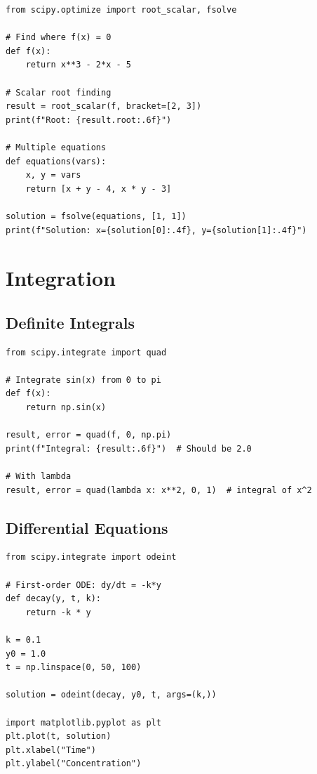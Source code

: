 \begin{lstlisting}
from scipy.optimize import root_scalar, fsolve

# Find where f(x) = 0
def f(x):
    return x**3 - 2*x - 5

# Scalar root finding
result = root_scalar(f, bracket=[2, 3])
print(f"Root: {result.root:.6f}")

# Multiple equations
def equations(vars):
    x, y = vars
    return [x + y - 4, x * y - 3]

solution = fsolve(equations, [1, 1])
print(f"Solution: x={solution[0]:.4f}, y={solution[1]:.4f}")
\end{lstlisting}

\section{Integration}
\label{sec:integration}

\subsection{Definite Integrals}

\begin{lstlisting}
from scipy.integrate import quad

# Integrate sin(x) from 0 to pi
def f(x):
    return np.sin(x)

result, error = quad(f, 0, np.pi)
print(f"Integral: {result:.6f}")  # Should be 2.0

# With lambda
result, error = quad(lambda x: x**2, 0, 1)  # integral of x^2
\end{lstlisting}

\subsection{Differential Equations}

\begin{lstlisting}
from scipy.integrate import odeint

# First-order ODE: dy/dt = -k*y
def decay(y, t, k):
    return -k * y

k = 0.1
y0 = 1.0
t = np.linspace(0, 50, 100)

solution = odeint(decay, y0, t, args=(k,))

import matplotlib.pyplot as plt
plt.plot(t, solution)
plt.xlabel("Time")
plt.ylabel("Concentration")
\end{lstlisting}

